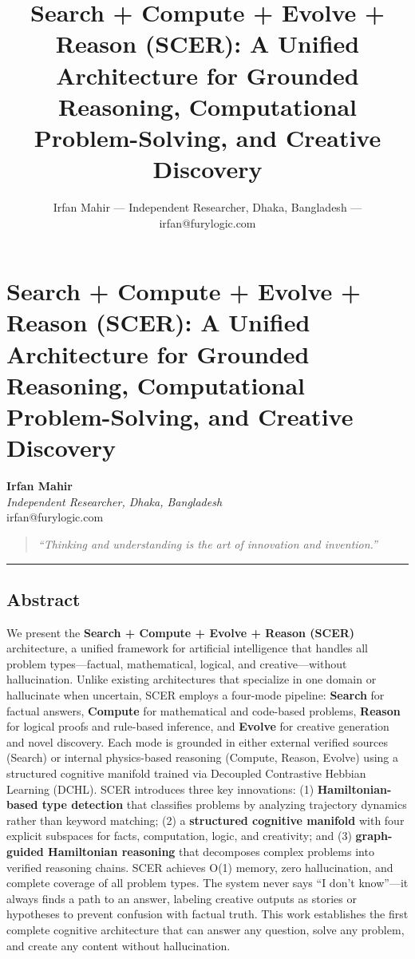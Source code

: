 \documentclass[
  11pt,
  a4paper,
]{article}
\title{Search + Compute + Evolve + Reason (SCER): A Unified Architecture
for Grounded Reasoning, Computational Problem-Solving, and Creative
Discovery}
\author{Irfan Mahir --- Independent Researcher, Dhaka, Bangladesh ---
irfan@furylogic.com}
\date{}
\begin{document}
\maketitle

{
\hypersetup{linkcolor=}
\setcounter{tocdepth}{3}
\tableofcontents
}
\section{Search + Compute + Evolve + Reason (SCER): A Unified
Architecture for Grounded Reasoning, Computational Problem-Solving, and
Creative
Discovery}\label{search-compute-evolve-reason-scer-a-unified-architecture-for-grounded-reasoning-computational-problem-solving-and-creative-discovery}

\textbf{Irfan Mahir}\\
\emph{Independent Researcher, Dhaka, Bangladesh}\\
irfan@furylogic.com

\begin{quote}
\emph{``Thinking and understanding is the art of innovation and
invention.''}
\end{quote}

\begin{center}\rule{0.5\linewidth}{0.5pt}\end{center}

\subsection{Abstract}\label{abstract}

We present the \textbf{Search + Compute + Evolve + Reason (SCER)}
architecture, a unified framework for artificial intelligence that
handles all problem types---factual, mathematical, logical, and
creative---without hallucination. Unlike existing architectures that
specialize in one domain or hallucinate when uncertain, SCER employs a
four-mode pipeline: \textbf{Search} for factual answers,
\textbf{Compute} for mathematical and code-based problems,
\textbf{Reason} for logical proofs and rule-based inference, and
\textbf{Evolve} for creative generation and novel discovery. Each mode
is grounded in either external verified sources (Search) or internal
physics-based reasoning (Compute, Reason, Evolve) using a structured
cognitive manifold trained via Decoupled Contrastive Hebbian Learning
(DCHL). SCER introduces three key innovations: (1)
\textbf{Hamiltonian-based type detection} that classifies problems by
analyzing trajectory dynamics rather than keyword matching; (2) a
\textbf{structured cognitive manifold} with four explicit subspaces for
facts, computation, logic, and creativity; and (3) \textbf{graph-guided
Hamiltonian reasoning} that decomposes complex problems into verified
reasoning chains. SCER achieves O(1) memory, zero hallucination, and
complete coverage of all problem types. The system never says ``I don't
know''---it always finds a path to an answer, labeling creative outputs
as stories or hypotheses to prevent confusion with factual truth. This
work establishes the first complete cognitive architecture that can
answer any question, solve any problem, and create any content without
hallucination.
\end{document}
